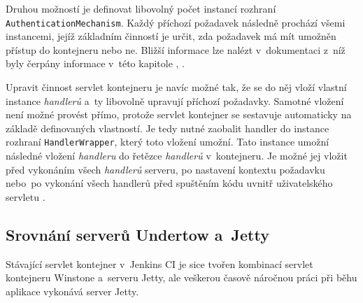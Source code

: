                 Druhou možností je definovat
                libovolný počet instancí rozhraní \\\texttt{AuthenticationMechanism}. Každý příchozí požadavek
                následně prochází všemi instancemi, jejíž základním činností je určit, zda požadavek má
                mít umožněn přístup do kontejneru nebo ne. Bližší informace lze nalézt v~dokumentaci z~níž
                byly čerpány informace v~této kapitole \cite{undertowDeployment}, \cite{undertowSecurity}.

                \medskip
                Upravit činnost servlet kontejneru je navíc možné tak, že se do něj vloží vlastní instance
                \emph{handlerů} a~ty libovolně upravují příchozí požadavky. Samotné vložení
                není možné provést přímo, protože servlet kontejner se sestavuje automaticky na základě
                definovaných vlastností. Je tedy nutné zaobalit handler do instance rozhraní \texttt{HandlerWrapper},
                který toto vložení umožní. Tato instance umožní následné vložení \emph{handleru} do řetězce \emph{handlerů}
                v~kontejneru. Je možné jej vložit před vykonáním všech \emph{handlerů} serveru, po
                nastavení kontextu požadavku nebo~po vykonání všech handlerů před spuštěním kódu uvnitř uživatelského 
                servletu \cite{undertowDeployment}.
 
        
        \subsection{Srovnání serverů Undertow a~Jetty}\label{srovnani}
            Stávající servlet kontejner v~Jenkins CI je sice tvořen
            kombinací servlet kontejneru Winstone a~serveru Jetty, ale veškerou
            časově náročnou práci při běhu aplikace vykonává server
            Jetty. 
            
